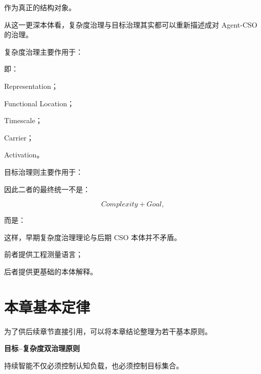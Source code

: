 作为真正的结构对象。

从这一更深本体看，复杂度治理与目标治理其实都可以重新描述成对 Agent-CSO 的治理。

复杂度治理主要作用于：

\begin{statementbox}
\centering
{}
\end{statementbox}

即：

Representation；

Functional Location；

Timescale；

Carrier；

Activation。

目标治理则主要作用于：

\begin{statementbox}
\centering
{}
\end{statementbox}

因此二者的最终统一不是：

\[
Complexity+Goal,
\]

而是：

\begin{statementbox}
\centering
{}
\end{statementbox}

这样，早期复杂度治理理论与后期 CSO 本体并不矛盾。

前者提供工程测量语言；

后者提供更基础的本体解释。


\section{本章基本定律}

为了供后续章节直接引用，可以将本章结论整理为若干基本原则。

\textbf{目标--复杂度双治理原则}

\begin{statementbox}
\centering
{}
\end{statementbox}

持续智能不仅必须控制认知负载，也必须控制目标集合。


